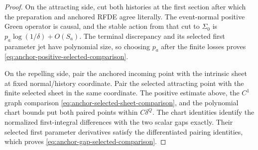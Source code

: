 
\begin{proof}
On the attracting side, cut both histories at the first section after which
the preparation and anchored RFDE agree literally.  The event-normal
positive Green operator is causal, and the stable action from that cut to
\(\Sigma_0\) is
\(p_a\log(1/\delta)+O(S_a)\).  The terminal discrepancy and its selected
first parameter jet have polynomial size, so choosing \(p_a\) after the
finite losses proves \cref{eq:anchor-positive-selected-comparison}.

On the repelling side, pair the anchored incoming point with the intrinsic
sheet at fixed normal/history coordinate.  Pair the selected attracting
point with the finite selected sheet in the same coordinate.  The positive
estimate above, the \(C^1\) graph comparison
\cref{eq:anchor-selected-sheet-comparison}, and the polynomial chart bounds
put both paired points within \(C\delta^Q\).  The chart identities identify
the normalized first-integral differences with the two scalar gaps exactly.
Their selected first parameter derivatives satisfy the differentiated
pairing identities, which proves \cref{eq:anchor-gap-selected-comparison}.
\end{proof}

